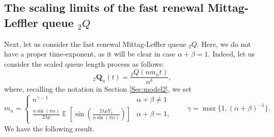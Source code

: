 \documentclass[]{amsart}
\numberwithin{equation}{section}
\theoremstyle{remark}
\theoremstyle{definition}
\DeclareMathOperator{\E}{\mathbb{E}}
\begin{document}
\subsection{The scaling limits of the fast renewal Mittag-Leffler queue ${}_2{Q}$}
Next, let us consider the fast renewal Mittag-Leffler queue ${}_2Q$. Here, we do not have a proper time-exponent, as it will be clear in case $\alpha+\beta=1$. Indeed, let us consider the scaled queue length process as follows:
\begin{equation}\label{eq:rescalingmod2}
	{}_2\mathbf{Q}_n(t)=\frac{{}_2Q(nm_nt)}{n^\delta},
\end{equation}
where, recalling the notation in Section \ref{Sec:model2}, we set
\begin{equation}\label{eq:mndef}
	m_n=\begin{cases}
		n^{\gamma-1} & \alpha+\beta \not = 1\\
		\frac{n \sin(\pi \alpha)}{2\lambda \mu}\E\left[\sin\left(\frac{2\lambda \mu Y_1}{n\sin(\pi \alpha)}\right)\right] & \alpha+\beta=1,
	\end{cases}\qquad \gamma=\max\{1,(\alpha+\beta)^{-1}\}.
\end{equation}
We have the following result.
\end{document}
